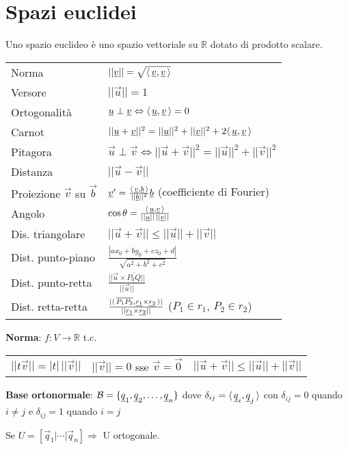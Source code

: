 \section{Spazi euclidei}

Uno spazio euclideo è uno spazio vettoriale su $\mathbb{R}$ dotato di prodotto scalare.

\begin{tabular}{ll}
	Norma & $||\underline{v}|| = \sqrt{\langle\,\underline{v},\underline{v}\,\rangle}$ \\
	Versore & $||\vec{u}|| = 1$ \\
	Ortogonalità & $\underline{u} \perp \underline{v} \Leftrightarrow \langle\,\underline{u},\underline{v}\,\rangle = 0$ \\
	Carnot & $||\underline{u}+\underline{v}||^2 = ||\underline{u}||^2+||\underline{v}||^2+2\langle\,\underline{u},\underline{v}\,\rangle$ \\
	Pitagora & $\vec{u} \perp \vec{v} \Leftrightarrow ||\vec{u}+\vec{v}||^2 = ||\vec{u}||^2+||\vec{v}||^2$ \\
	Distanza & $||\vec{u}-\vec{v}||$ \\
	Proiezione $\vec{v}$ su $\vec{b}$ & $\underline{v}' = \frac{\langle\,\underline{v},\underline{b}\,\rangle}{||\underline{b}||^2}\underline{b}$ (coefficiente di Fourier) \\
	Angolo & $\cos \theta = \frac{\langle\,\underline{u},\underline{v}\,\rangle}{||\underline{u}||\,||\underline{v}||}$ \\
	Dis. triangolare & $||\vec{u}+\vec{v}|| \le ||\vec{u}||+||\vec{v}||$ \\
	Dist. punto-piano & $\frac{|ax_0 + by_0 + cz_0 + d|}{\sqrt{a^2 + b^2 + c^2}}$ \\
	Dist. punto-retta & $\frac{||\vec{u} \times \overline{P_0Q}||}{||\vec{u}||}$ \\
	Dist. retta-retta & $\frac{|\langle\,\overline{P_1P_2},\underline{r_1} \times \underline{r_2}\,\rangle|}{||\underline{r_1} \times \underline{r_2}||}$ ($P_1 \in r_1$, $P_2 \in r_2$)
\end{tabular}

\textbf{Norma}: $f: V \rightarrow \mathbb{R}$ t.c.
\begin{tabular}{lll}
	$||t\vec{v}|| = |t|\,||\vec{v}||$ &
	$||\vec{v}|| = 0$ sse $\vec{v} = \vec{0}$ &
	$||\vec{u}+\vec{v}|| \le ||\vec{u}||+||\vec{v}||$
\end{tabular}

\textbf{Base ortonormale}: $\mathcal{B} = \{\underline{q}_1, \underline{q}_2, \dots, \underline{q}_n\}$ dove $\delta_{ij} = \langle\,\underline{q}_i,\underline{q}_j\,\rangle$ con $\delta_{ij} = 0$ quando $i \ne j$ e $\delta_{ij} = 1$ quando $i = j$

Se $U = [\vec{q}_1 | \cdots | \vec{q}_n] \Rightarrow$ U ortogonale.
